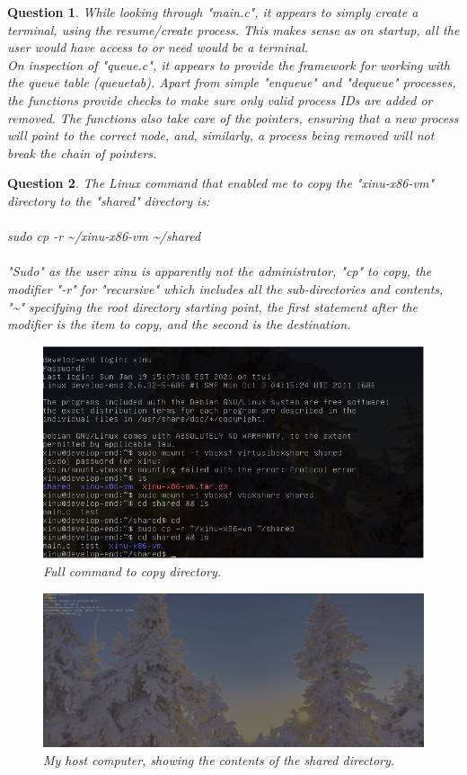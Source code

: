 \documentclass{article}
\newtheorem{theorem}{Question}
\begin{document}
\begin{theorem}
While looking through "main.c", it appears to simply create a terminal, using the resume/create process. This makes sense
as on startup, all the user would have access to or need would be a terminal.\\
On inspection of "queue.c", it appears to provide the framework for working with the queue table (queuetab). Apart from simple
 "enqueue" and "dequeue" processes, the functions provide checks to make sure only valid process IDs are added or removed.
The functions also take care of the pointers, ensuring that a new process will point to the correct node, and, similarly,
a process being removed will not break the chain of pointers.
\end{theorem}

\begin{theorem}
The Linux command that enabled me to copy the "xinu-x86-vm" directory to the "shared" directory is:\\\\
sudo cp -r {\textasciitilde{}}/xinu-x86-vm {\textasciitilde{}}/shared\\\\
"Sudo" as the user xinu is apparently not the administrator, "cp" to copy, the modifier "-r" for "recursive" which includes
all the sub-directories and contents, "{\textasciitilde{}}" specifying the root directory starting point,
 the first statement after the modifier is the item to copy, and the second is the destination.\\
\begin{figure}[ht!]
  \includegraphics[width=\textwidth]{cp.png}
  \caption{Full command to copy directory.}
\end{figure}
\begin{figure}[ht!]
  \includegraphics[width=\textwidth]{cp_home.png}
  \caption{My host computer, showing the contents of the shared directory.}
\end{figure}
\end{theorem}
\end{document}
